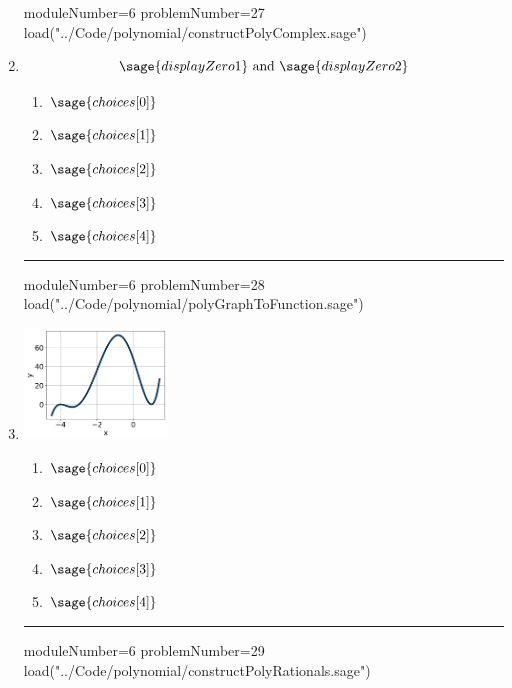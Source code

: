 \documentclass[14pt]{article}
\newcommand{\litem}[1]{\item#1\hspace*{-1cm}\rule{\textwidth}{0.4pt}}
\begin{document}
\begin{enumerate}
\begin{sagesilent}
moduleNumber=6
problemNumber=27
load("../Code/polynomial/constructPolyComplex.sage")
\end{sagesilent}

\litem{	

	\[ \sage{displayZero1} \text{ and } \sage{displayZero2} \]

	\begin{enumerate}[label=\Alph*.]
		\item \( \sage{choices[0]} \)
		\item \( \sage{choices[1]} \)
		\item \( \sage{choices[2]} \)
		\item \( \sage{choices[3]} \)
		\item \( \sage{choices[4]} \)
	\end{enumerate}
}

\begin{sagesilent}
moduleNumber=6
problemNumber=28
load("../Code/polynomial/polyGraphToFunction.sage")
\end{sagesilent}

\litem{ 

	\begin{center}
	\includegraphics[width = 0.3\textwidth]{../Figures/polyGraphToFunctionA.png}
	\end{center}

	\begin{enumerate}[label=\Alph*.]
		\item \( \sage{choices[0]} \)
		\item \( \sage{choices[1]} \)
		\item \( \sage{choices[2]} \)
		\item \( \sage{choices[3]} \)
		\item \( \sage{choices[4]} \)
	\end{enumerate}
}

\begin{sagesilent}
moduleNumber=6
problemNumber=29
load("../Code/polynomial/constructPolyRationals.sage")
\end{sagesilent}


\end{enumerate}
\end{document}
